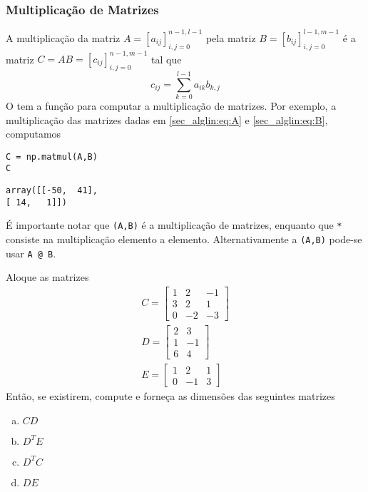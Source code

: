 \documentclass[12pt]{article}
\begin{document}
\subsubsection{Multiplicação de Matrizes}

A multiplicação da matriz $A = [a_{ij}]_{i,j=0}^{n-1,l-1}$ pela matriz $B = [b_{ij}]_{i,j=0}^{l-1,m-1}$ é a matriz $C = AB = [c_{ij}]_{i,j=0}^{n-1,m-1}$ tal que
\begin{equation}
  c_{ij} = \sum_{k=0}^{l-1} a_{ik}b_{k,j}
\end{equation}
O {\PYTHONnumpy} tem a função {\PYTHONnumpyDOTmatmul} para computar a multiplicação de matrizes. Por exemplo, a multiplicação das matrizes dadas em \eqref{sec_alglin:eq:A} e \eqref{sec_alglin:eq:B}, computamos

\begin{lstlisting}
C = np.matmul(A,B)
C
\end{lstlisting}

\begin{verbatim}
array([[-50,  41],
[ 14,   1]])
\end{verbatim}

\begin{obs}
  É importante notar que {\PYTHONnumpyDOTmatmul}\texttt{(A,B)} é a multiplicação de matrizes, enquanto que \lstinline+*+ consiste na multiplicação elemento a elemento. Alternativamente a {\PYTHONnumpyDOTmatmul}\texttt{(A,B)} pode-se usar \texttt{A @ B}.
\end{obs}

\begin{exr}
  Aloque as matrizes
  \begin{gather}
    C =
    \begin{bmatrix}
      1 & 2 & -1 \\
      3 & 2 & 1 \\
      0 & -2 & -3
    \end{bmatrix}\\
    D =
    \begin{bmatrix}
      2 & 3 \\
      1 & -1 \\
      6 & 4
    \end{bmatrix}\\
    E =
    \begin{bmatrix}
      1 & 2 & 1 \\
      0 & -1 & 3
    \end{bmatrix}
  \end{gather}
  Então, se existirem, compute e forneça as dimensões das seguintes matrizes
  \begin{enumerate}[a)]
  \item $CD$
  \item $D^TE$
  \item $D^TC$
  \item $DE$
  \end{enumerate}
\end{exr}
\end{document}
